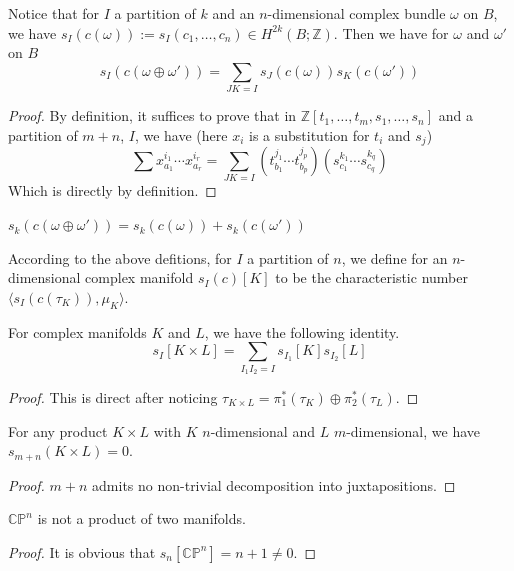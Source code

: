 	\begin{lemma}\label{s_I_prod_formula}
		Notice that for $I$ a partition of $k$ and an $n$-dimensional complex bundle $\omega$ on $B$, we have $s_I(c(\omega)):=s_I(c_1,\dots,c_n)\in H^{2k}(B;\mathbb{Z})$. Then we have for $\omega$ and $\omega'$ on $B$
		\[ s_I(c(\omega\oplus\omega'))=\sum_{JK=I}s_J(c(\omega))s_K(c(\omega')) \]
	\end{lemma}
	\begin{proof}
		By definition, it suffices to prove that in $\mathbb{Z}[t_1,\dots,t_m,s_1,\dots,s_n]$ and a partition of $m+n$, $I$, we have (here $x_i$ is a substitution for $t_i$ and $s_j$)
		\[ \sum x_{a_1}^{i_1}\cdots x_{a_r}^{i_r}=\sum_{JK=I}\left(t_{b_1}^{j_1}\cdots t_{b_p}^{j_p}\right)\left(s_{c_1}^{k_1}\cdots s_{c_q}^{k_q}\right) \]
		Which is directly by definition. 
	\end{proof}
	\begin{coro}\label{s_k_additivity}
		$s_k(c(\omega\oplus\omega'))=s_k(c(\omega))+s_k(c(\omega'))$
	\end{coro}
	\begin{defn}
		According to the above defitions, for $I$ a partition of $n$, we define for an $n$-dimensional complex manifold $s_I(c)[K]$ to be the characteristic number $\langle s_I(c(\tau_K)),\mu_K\rangle$. 
	\end{defn}
	\begin{coro}\label{Chern_sym_poly}
		For complex manifolds $K$ and $L$, we have the following identity. 
		\[ s_I[K\times L]=\sum_{I_1I_2=I}s_{I_1}[K]s_{I_2}[L] \]
	\end{coro}
	\begin{proof}
		This is direct after noticing $\tau_{K\times L}=\pi_1^*(\tau_K)\oplus\pi_2^*(\tau_L)$. 
	\end{proof}
	\begin{coro}
		For any product $K\times L$ with $K$ $n$-dimensional and $L$ $m$-dimensional, we have $s_{m+n}(K\times L)=0$. 
	\end{coro}
	\begin{proof}
		$m+n$ admits no non-trivial decomposition into juxtapositions. 
	\end{proof}
	\begin{coro}
		$\mathbb{CP}^n$ is not a product of two manifolds. 
	\end{coro}
	\begin{proof}
		It is obvious that $s_n[\mathbb{CP}^n]=n+1\neq0$. 
	\end{proof}

